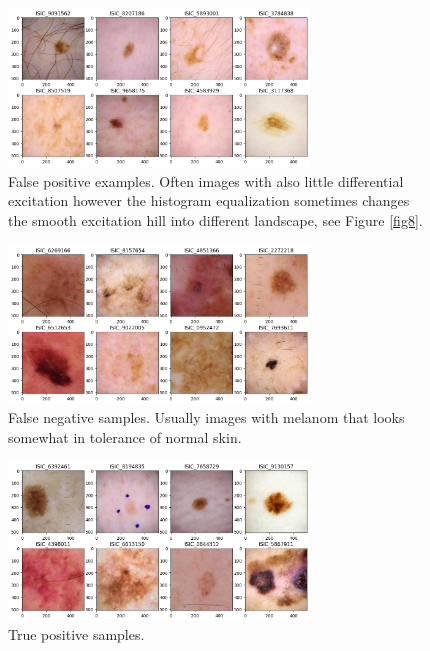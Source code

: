 \documentclass[a4paper,10pt,twocolumn]{article}
\begin{document}
\begin{figure}[H]
      \begin{center}
            \includegraphics[width=8cm]{false_positive}
      \end{center}
      \caption{False positive examples. Often images with also little differential excitation however the histogram equalization sometimes changes the smooth excitation hill into different landscape, see Figure \ref{fig8}.}
      \label{fig5}
\end{figure}

\begin{figure}[H]
      \begin{center}
            \includegraphics[width=8cm]{false_negative}
      \end{center}
      \caption{False negative samples. Usually images with melanom that looks somewhat in tolerance of normal skin.}
      \label{fig6}
\end{figure}

\begin{figure}[H]
      \begin{center}
            \includegraphics[width=8cm]{true_positive}
      \end{center}
      \caption{True positive samples.}
      \label{fig7}
\end{figure}
\end{document}
